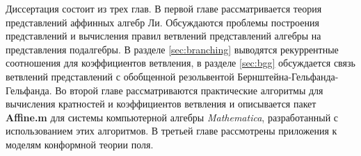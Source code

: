 \intro

%
%

\actualitysection
\actualitytext

\objectivesection

\objectivetext

\noveltysection
\noveltytext

{}

\resultssection
\resultstext

\approbationsection
\approbationtext

\pubsection
\pubtext

\contribsection
\contribtext

\structsection
\structtext
Диссертация состоит из трех глав. В первой главе рассматривается теория представлений аффинных алгебр Ли. Обсуждаются проблемы построения представлений и вычисления правил ветвлений представлений алгебры на представления подалгебры. В разделе \ref{sec:branching}  выводятся рекуррентные соотношения для коэффициентов ветвления, в разделе \ref{sec:bgg} обсуждается связь ветвлений представлений с обобщенной резольвентой Бернштейна-Гельфанда-Гельфанда. Во второй главе рассматриваются практические алгоритмы для вычисления кратностей и коэффициентов ветвления и описывается пакет {\bf Affine.m} для системы компьютерной алгебры {\it Mathematica}, разработанный с использованием этих алгоритмов. В третьей главе рассмотрены приложения к моделям конформной теории поля. 
